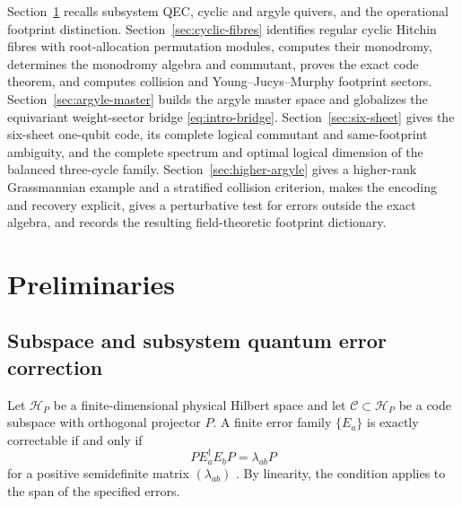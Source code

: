 \documentclass[11pt]{article}
\theoremstyle{definition}
\theoremstyle{remark}
\newcommand{\cH}{\mathcal H}
\newcommand{\cC}{\mathcal C}
\begin{document}
Section~\ref{sec:prelim} recalls subsystem QEC, cyclic and argyle quivers, and the operational footprint distinction.  Section~\ref{sec:cyclic-fibres} identifies regular cyclic Hitchin fibres with root-allocation permutation modules, computes their monodromy, determines the monodromy algebra and commutant, proves the exact code theorem, and computes collision and Young--Jucys--Murphy footprint sectors.  Section~\ref{sec:argyle-master} builds the argyle master space and globalizes the equivariant weight-sector bridge \eqref{eq:intro-bridge}.  Section~\ref{sec:six-sheet} gives the six-sheet one-qubit code, its complete logical commutant and same-footprint ambiguity, and the complete spectrum and optimal logical dimension of the balanced three-cycle family.  Section~\ref{sec:higher-argyle} gives a higher-rank Grassmannian example and a stratified collision criterion, makes the encoding and recovery explicit, gives a perturbative test for errors outside the exact algebra, and records the resulting field-theoretic footprint dictionary.

\section{Preliminaries}\label{sec:prelim}

\subsection{Subspace and subsystem quantum error correction}

Let $\cH_P$ be a finite-dimensional physical Hilbert space and let $\cC\subset\cH_P$ be a code subspace with orthogonal projector $P$.  A finite error family $\{E_a\}$ is exactly correctable if and only if
\begin{equation}\label{eq:KL}
  PE_a^\dagger E_bP=\lambda_{ab}P
\end{equation}
for a positive semidefinite matrix $(\lambda_{ab})$ \cite{KnillLaflamme1997}.  By linearity, the condition applies to the span of the specified errors.
\end{document}
